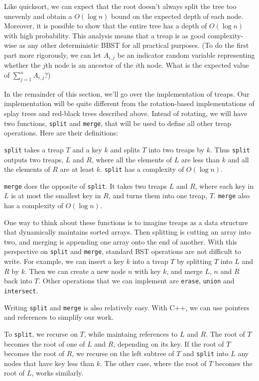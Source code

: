 Like quicksort, we can expect that the root doesn't always split the tree too unevenly and obtain a $O(\log n)$ bound on the expected depth of each node. Moreover, it is possible to show that the entire tree has a depth of $O(\log n)$ with high probability. This analysis means that a treap is as good complexity-wise as any other deterministic BBST for all practical purposes. (To do the first part more rigorously, we can let $A_{i,j}$ be an indicator random variable representing whether the $j$th node is an ancestor of the $i$th node. What is the expected value of $\sum_{j=1}^n A_{i,j}$?) 

In the remainder of this section, we'll go over the implementation of treaps. Our implementation will be quite different from the rotation-based implementations of splay trees and red-black trees described above. Intead of rotating, we will have two functions, \texttt{split} and \texttt{merge}, that will be used to define all other treap operations. Here are their definitions:

\texttt{split} takes a treap $T$ and a key $k$ and splits $T$ into two treaps by $k$. Thus \texttt{split} outputs two treaps, $L$ and $R$, where all the elements of $L$ are less than $k$ and all the elements of $R$ are at least $k$. \texttt{split} has a complexity of $O(\log n)$.

\texttt{merge} does the opposite of \texttt{split}. It takes two treaps $L$ and $R$, where each key in $L$ is at most the smallest key in $R$, and turns them into one treap, $T$. \texttt{merge} also has a complexity of $O(\log n)$.

One way to think about these functions is to imagine treaps as a data structure that dynamically maintains sorted arrays. Then splitting is cutting an array into two, and merging is appending one array onto the end of another. With this perspective on \texttt{split} and \texttt{merge}, standard BST operations are not difficult to write. For example, we can insert a key $k$ into a treap $T$ by splitting $T$ into $L$ and $R$ by $k$. Then we can create a new node $n$ with key $k$, and merge $L$, $n$ and $R$ back into $T$. Other operations that we can implement are \texttt{erase}, \texttt{union} and \texttt{intersect}. 

Writing \texttt{split} and \texttt{merge} is also relatively easy. With C++, we can use pointers and references to simplify our work.

To \texttt{split}, we recurse on $T$, while maintaing references to $L$ and $R$. The root of $T$ becomes the root of one of $L$ and $R$, depending on its key. If the root of $T$ becomes the root of $R$, we recurse on the left subtree of $T$ and \texttt{split} into $L$ any nodes that have key less than $k$. The other case, where the root of $T$ becomes the root of $L$, works similarly.

